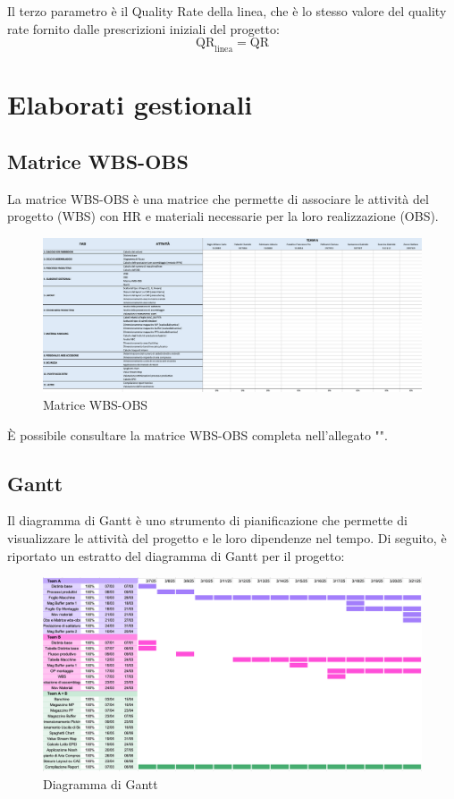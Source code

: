 \documentclass[11pt]{article}
\begin{document}
Il terzo parametro è il Quality Rate della linea, che è lo stesso valore del quality rate fornito dalle prescrizioni iniziali del progetto:
\begin{equation}
    \text{QR}_\text{linea} = \text{QR}
\end{equation}


\newpage


\section{Elaborati gestionali}
\subsection{Matrice WBS-OBS}
La matrice WBS-OBS è una matrice che permette di associare le attività del progetto (WBS) con HR e materiali necessarie per la loro realizzazione (OBS).
\begin{figure} [H]
    \centering
    \includegraphics[width=\textwidth]{images/Matrice WBS-OBS.png}
    \caption{Matrice WBS-OBS}
    \label{fig: Matrice WBS-OBS}
\end{figure}

\noindent
È possibile consultare la matrice WBS-OBS completa nell'allegato "".
\newpage

\subsection{Gantt}
Il diagramma di Gantt è uno strumento di pianificazione che permette di visualizzare le attività del progetto e le loro dipendenze nel tempo.
Di seguito, è riportato un estratto del diagramma di Gantt per il progetto:
\begin{figure} [H]
    \centering
    \includegraphics[width=\textwidth]{images/Gantt.png}
    \caption{Diagramma di Gantt}
    \label{fig: Diagramma di Gantt}
\end{figure}
\end{document}
